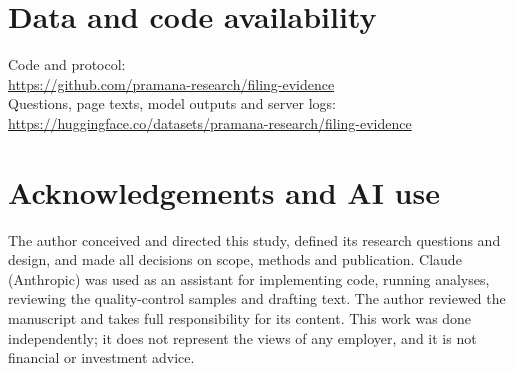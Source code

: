 \documentclass[11pt]{article}
\begin{document}
\FloatBarrier
\section*{Data and code availability}
\noindent Code and protocol:\\\url{https://github.com/pramana-research/filing-evidence}\\[4pt]
Questions, page texts, model outputs and server logs:\\\url{https://huggingface.co/datasets/pramana-research/filing-evidence}

\section*{Acknowledgements and AI use}
The author conceived and directed this study, defined its research questions and design, and made all decisions on scope, methods and publication. Claude (Anthropic) was used as an assistant for implementing code, running analyses, reviewing the quality-control samples and drafting text. The author reviewed the manuscript and takes full responsibility for its content. This work was done independently; it does not represent the views of any employer, and it is not financial or investment advice.
\end{document}
